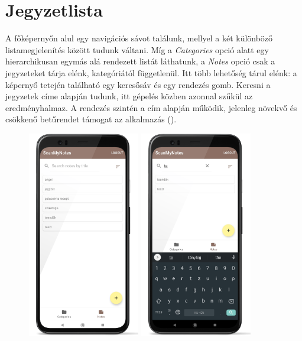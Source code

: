 \section{Jegyzetlista}
A főképernyőn alul egy navigációs sávot találunk, mellyel a két különböző listamegjelenítés között tudunk váltani. Míg a \emph{Categories} opció alatt egy hierarchikusan egymás alá rendezett listát láthatunk, a \emph{Notes} opció csak a jegyzeteket tárja elénk, kategóriától függetlenül. Itt több lehetőség tárul elénk: a képernyő tetején található egy keresősáv és egy rendezés gomb. Keresni a jegyzetek címe alapján tudunk, itt gépelés közben azonnal szűkül az eredményhalmaz. A rendezés szintén a cím alapján működik, jelenleg növekvő és csökkenő betűrendet támogat az alkalmazás ().

\begin{figure}[!ht]
	\centering
	\includegraphics[width=49mm, keepaspectratio]{figures/notelist_full.png}
	\includegraphics[width=49mm, keepaspectratio]{figures/notelist_search.png}

\end{figure}
